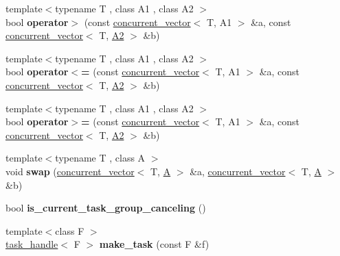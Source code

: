 \begin{DoxyCompactItemize}
\item 
\hypertarget{namespacetbb_a78cfed58bfde865b68859beb54805019}{}{\footnotesize template$<$typename T , class A1 , class A2 $>$ }\\bool {\bfseries operator$>$} (const \hyperlink{classtbb_1_1concurrent__vector}{concurrent\+\_\+vector}$<$ T, A1 $>$ \&a, const \hyperlink{classtbb_1_1concurrent__vector}{concurrent\+\_\+vector}$<$ T, \hyperlink{classA2}{A2} $>$ \&b)\label{namespacetbb_a78cfed58bfde865b68859beb54805019}

\item 
\hypertarget{namespacetbb_ac6009f009cd331952d8944bcc9733375}{}{\footnotesize template$<$typename T , class A1 , class A2 $>$ }\\bool {\bfseries operator$<$=} (const \hyperlink{classtbb_1_1concurrent__vector}{concurrent\+\_\+vector}$<$ T, A1 $>$ \&a, const \hyperlink{classtbb_1_1concurrent__vector}{concurrent\+\_\+vector}$<$ T, \hyperlink{classA2}{A2} $>$ \&b)\label{namespacetbb_ac6009f009cd331952d8944bcc9733375}

\item 
\hypertarget{namespacetbb_aa0d82e59919a1f2c7caa06d061b2480f}{}{\footnotesize template$<$typename T , class A1 , class A2 $>$ }\\bool {\bfseries operator$>$=} (const \hyperlink{classtbb_1_1concurrent__vector}{concurrent\+\_\+vector}$<$ T, A1 $>$ \&a, const \hyperlink{classtbb_1_1concurrent__vector}{concurrent\+\_\+vector}$<$ T, \hyperlink{classA2}{A2} $>$ \&b)\label{namespacetbb_aa0d82e59919a1f2c7caa06d061b2480f}

\item 
\hypertarget{namespacetbb_a4cd91084f08db8c2d23c6a0362e0c441}{}{\footnotesize template$<$typename T , class A $>$ }\\void {\bfseries swap} (\hyperlink{classtbb_1_1concurrent__vector}{concurrent\+\_\+vector}$<$ T, \hyperlink{structA}{A} $>$ \&a, \hyperlink{classtbb_1_1concurrent__vector}{concurrent\+\_\+vector}$<$ T, \hyperlink{structA}{A} $>$ \&b)\label{namespacetbb_a4cd91084f08db8c2d23c6a0362e0c441}

\item 
\hypertarget{namespacetbb_aaef1698b222ba9312ab24dcdcd98bbd8}{}bool {\bfseries is\+\_\+current\+\_\+task\+\_\+group\+\_\+canceling} ()\label{namespacetbb_aaef1698b222ba9312ab24dcdcd98bbd8}

\item 
\hypertarget{namespacetbb_a6c291402bcc0ba9263cf08b76faf7a2c}{}{\footnotesize template$<$class F $>$ }\\\hyperlink{classtbb_1_1task__handle}{task\+\_\+handle}$<$ F $>$ {\bfseries make\+\_\+task} (const F \&f)\label{namespacetbb_a6c291402bcc0ba9263cf08b76faf7a2c}


\end{DoxyCompactItemize}

